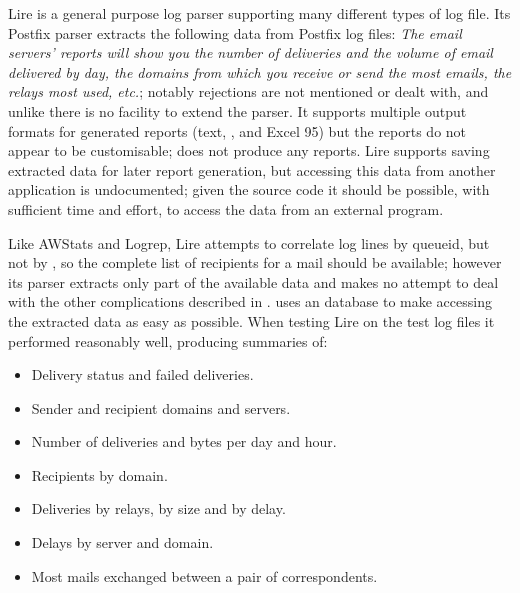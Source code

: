 Lire is a general purpose log parser supporting many different types of log
file.  Its Postfix parser extracts the following data from Postfix log
files: \textit{The email servers' reports will show you the number of
deliveries and the volume of email delivered by day, the domains from which
you receive or send the most emails, the relays most used, etc.\/}; notably
rejections are not mentioned or dealt with, and unlike \parsername{} there
is no facility to extend the parser.  It supports multiple output formats
for generated reports (text, \HTML{}, \PDF{} and Excel 95) but the reports
do not appear to be customisable; \parsername{} does not produce any
reports.  Lire supports saving extracted data for later report generation,
but accessing this data from another application is undocumented; given the
source code it should be possible, with sufficient time and effort, to
access the data from an external program.

Like AWStats and Logrep, Lire attempts to correlate log lines by queueid,
but not by \pid{}, so the complete list of recipients for a mail should be
available; however its parser extracts only part of the available data and
makes no attempt to deal with the other complications described in
 .
\parsername{} uses an \SQL{} database to make accessing the extracted data
as easy as possible.  When testing Lire on the \numberOFlogFILES{} test log
files it performed reasonably well, producing summaries of: 

\begin{itemize}

    \item Delivery status and failed deliveries.

    \item Sender and recipient domains and servers.

    \item Number of deliveries and bytes per day and hour.

    \item Recipients by domain.

    \item Deliveries by relays, by size and by delay.

    \item Delays by server and domain.

    \item Most mails exchanged between a pair of correspondents.

\end{itemize}

